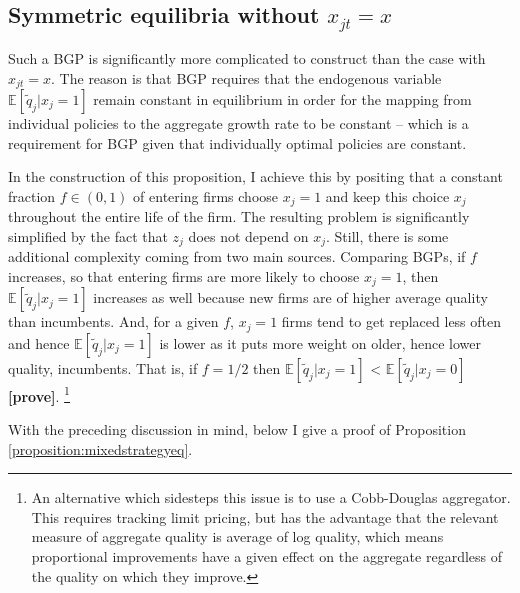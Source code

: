 \documentclass[11pt,english]{article}
\begin{document}
\subsection{Symmetric equilibria without $x_{jt} = x$}\label{appendix:model:proofs:proposition:mixedstrategyeq}

Such a BGP is significantly more complicated to construct than the case with $x_{jt} = x$. The reason is that BGP requires that the endogenous variable $\mathbb{E}[\tilde{q}_j | x_j = 1]$ remain constant in equilibrium in order for the mapping from individual policies to the aggregate growth rate to be constant -- which is a requirement for BGP given that individually optimal policies are constant. 

In the construction of this proposition, I achieve this by positing that a constant fraction $f \in (0,1)$ of entering firms choose $x_j = 1$ and keep this choice $x_j$ throughout the entire life of the firm. The resulting problem is significantly simplified by the fact that $z_j$ does not depend on $x_j$. Still, there is some additional complexity coming from two main sources. Comparing BGPs, if $f$ increases, so that entering firms are more likely to choose $x_j = 1$, then $\mathbb{E}[\tilde{q}_j | x_j = 1]$ increases as well because new firms are of higher average quality than incumbents. And, for a given $f$, $x_j = 1$ firms tend to get replaced less often and hence $\mathbb{E}[\tilde{q}_j | x_j = 1]$ is lower as it puts more weight on older, hence lower quality, incumbents. That is, if $f = 1/2$ then $\mathbb{E}[\tilde{q}_j | x_j = 1]$ < $\mathbb{E}[\tilde{q}_j | x_j = 0]$ \textbf{[prove]}. \footnote{An alternative which sidesteps this issue is to use a Cobb-Douglas aggregator. This requires tracking limit pricing, but has the advantage that the relevant measure of aggregate quality is average of log quality, which means proportional improvements have a given effect on the aggregate regardless of the quality on which they improve.}

With the preceding discussion in mind, below I give a proof of Proposition \ref{proposition:mixedstrategyeq}.
\end{document}
